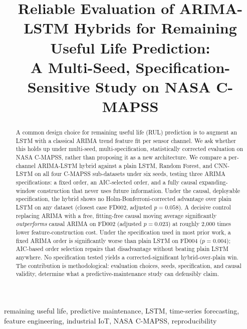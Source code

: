\documentclass[conference]{IEEEtran}
\newif\ifblind
\begin{document}
\title{Reliable Evaluation of ARIMA-LSTM Hybrids for Remaining Useful Life Prediction: \\ A Multi-Seed, Specification-Sensitive Study on NASA C-MAPSS}

\author{
\ifblind
\IEEEauthorblockN{Anonymous Author(s)}
\IEEEauthorblockA{Affiliation withheld for blind review}
\else
{}
\fi
}

\maketitle

\begin{abstract}
A common design choice for remaining useful life (RUL) prediction is to augment an LSTM with a classical ARIMA trend feature fit per sensor channel. We ask whether this holds up under multi-seed, multi-specification, statistically corrected evaluation on NASA C-MAPSS, rather than proposing it as a new architecture. We compare a per-channel ARIMA-LSTM hybrid against a plain LSTM, Random Forest, and CNN-LSTM on all four C-MAPSS sub-datasets under six seeds, testing three ARIMA specifications: a fixed order, an AIC-selected order, and a fully causal expanding-window construction that never uses future information. Under the causal, deployable specification, the hybrid shows no Holm-Bonferroni-corrected advantage over plain LSTM on any dataset (closest case FD002, adjusted $p=0.058$). A decisive control replacing ARIMA with a free, fitting-free causal moving average significantly \emph{outperforms} causal ARIMA on FD002 (adjusted $p=0.023$) at roughly 2,000 times lower feature-construction cost. Under the specification used in most prior work, a fixed ARIMA order is significantly worse than plain LSTM on FD004 ($p=0.004$); AIC-based order selection repairs that disadvantage without beating plain LSTM anywhere. No specification tested yields a corrected-significant hybrid-over-plain win. The contribution is methodological: evaluation choices, seeds, specification, and causal validity, determine what a predictive-maintenance study can defensibly claim.
\end{abstract}

\begin{IEEEkeywords}
remaining useful life, predictive maintenance, LSTM, time-series forecasting, feature engineering, industrial IoT, NASA C-MAPSS, reproducibility
\end{IEEEkeywords}
\end{document}
